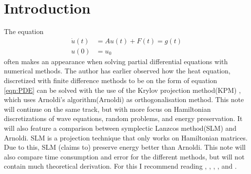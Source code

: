 \chapter{Introduction}

The equation 
\begin{equation} 
\begin{aligned}
\dot{u}(t) &= A u(t) + F(t) = g(t) \\
u(0)&= u_0
\end{aligned}
\label{eqn:PDE}
\end{equation}
often makes an appearance when solving partial differential equations with numerical methods. The author has earlier observed how the heat equation, discretized with finite difference methods to be on the form of equation \eqref{eqn:PDE} can be solved with the use of the Krylov projection method(KPM) \cite{min}, which uses Arnoldi's algorithm(Arnoldi) as orthogonalisation method. This note will continue on the same track, but with more focus on Hamiltonian discretizations of wave equations, random problems, and energy preservation. It will also feature a comparison between symplectic Lanzcos method(SLM) \cite{SLM} and Arnoldi. SLM is a projection technique that only works on Hamiltonian matrices. Due to this, SLM (claims to) preserve energy better than Arnoldi. This note will also compare time consumption and error for the different methods, but will not contain much theoretical derivation. For this I recommend reading \cite{elena}, \cite{min}, \citep{SLM}, \cite{SLMO}, and \cite{luli}. \\



